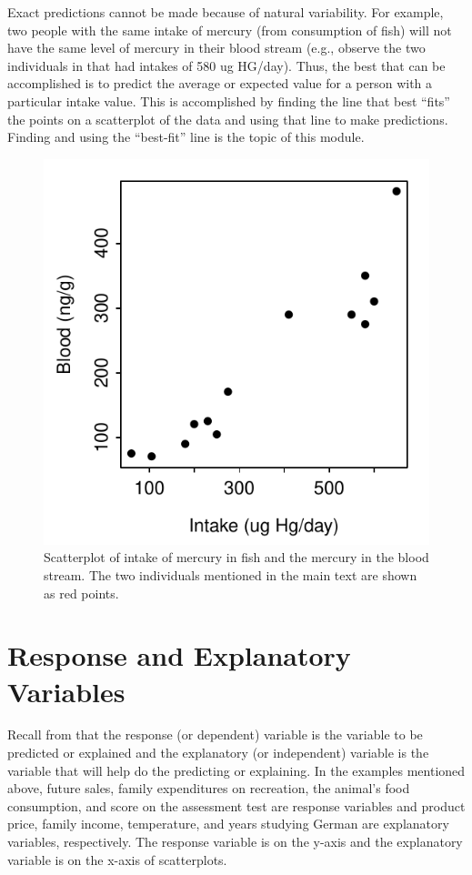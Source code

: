 \documentclass[10pt,openany]{book}\usepackage[]{graphicx}\usepackage[]{color}
\newenvironment{knitrout}{}{} %
\begin{document}
Exact predictions cannot be made because of natural variability. For example, two people with the same intake of mercury (from consumption of fish) will not have the same level of mercury in their blood stream (e.g., observe the two individuals in  that had intakes of 580 ug HG/day). Thus, the best that can be accomplished is to predict the average or expected value for a person with a particular intake value. This is accomplished by finding the line that best ``fits'' the points on a scatterplot of the data and using that line to make predictions. Finding and using the ``best-fit'' line is the topic of this module.

\begin{knitrout}
\color{fgcolor}\begin{figure}[hbtp]

{\centering \includegraphics[width=.4\linewidth]{Figs/HGscat-1} 

}

\caption[Scatterplot of intake of mercury in fish and the mercury in the blood stream]{Scatterplot of intake of mercury in fish and the mercury in the blood stream. The two individuals mentioned in the main text are shown as red points.}\label{fig:HGscat}
\end{figure}


\end{knitrout}


\section{Response and Explanatory Variables}
Recall from  that the response (or dependent) variable is the variable to be predicted or explained and the explanatory (or independent) variable is the variable that will help do the predicting or explaining. In the examples mentioned above, future sales, family expenditures on recreation, the animal's food consumption, and score on the assessment test are response variables and product price, family income, temperature, and years studying German are explanatory variables, respectively. The response variable is on the y-axis and the explanatory variable is on the x-axis of scatterplots.
\end{document}
